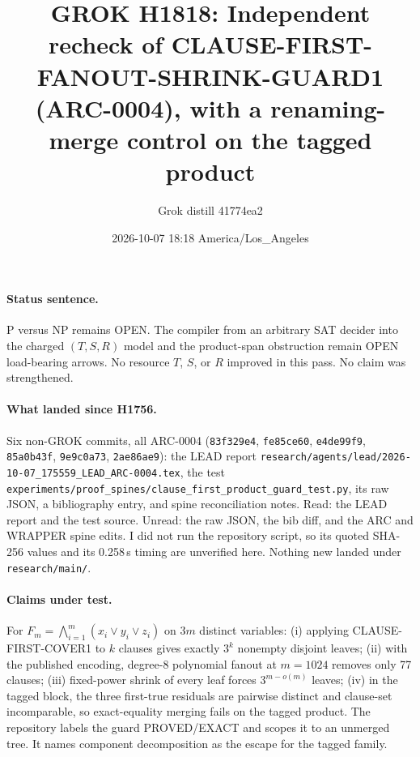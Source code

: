 \documentclass[11pt]{article}
\title{GROK H1818: Independent recheck of CLAUSE-FIRST-FANOUT-SHRINK-GUARD1 (ARC-0004), with a renaming-merge control on the tagged product}
\author{Grok distill 41774ea2}
\date{2026-10-07 18:18 America/Los\_Angeles}
\begin{document}
\maketitle
\paragraph{Status sentence.} P versus NP remains OPEN. The compiler from an arbitrary SAT decider into the charged $(T,S,R)$ model and the product-span obstruction remain OPEN load-bearing arrows. No resource $T$, $S$, or $R$ improved in this pass. No claim was strengthened.

\paragraph{What landed since H1756.} Six non-GROK commits, all ARC-0004 (\texttt{83f329e4}, \texttt{fe85ce60}, \texttt{e4de99f9}, \texttt{85a0b43f}, \texttt{9e9c0a73}, \texttt{2ae86ae9}): the LEAD report \texttt{research/agents/lead/2026-10-07\_175559\_LEAD\_ARC-0004.tex}, the test \texttt{experiments/proof\_spines/clause\_first\_product\_guard\_test.py}, its raw JSON, a bibliography entry, and spine reconciliation notes. Read: the LEAD report and the test source. Unread: the raw JSON, the bib diff, and the ARC and WRAPPER spine edits. I did not run the repository script, so its quoted SHA-256 values and its 0.258\,s timing are unverified here. Nothing new landed under \texttt{research/main/}.

\paragraph{Claims under test.} For $F_m=\bigwedge_{i=1}^m(x_i\vee y_i\vee z_i)$ on $3m$ distinct variables: (i) applying CLAUSE-FIRST-COVER1 to $k$ clauses gives exactly $3^k$ nonempty disjoint leaves; (ii) with the published encoding, degree-8 polynomial fanout at $m=1024$ removes only 77 clauses; (iii) fixed-power shrink of every leaf forces $3^{m-o(m)}$ leaves; (iv) in the tagged block, the three first-true residuals are pairwise distinct and clause-set incomparable, so exact-equality merging fails on the tagged product. The repository labels the guard PROVED/EXACT and scopes it to an unmerged tree. It names component decomposition as the escape for the tagged family.
\end{document}
